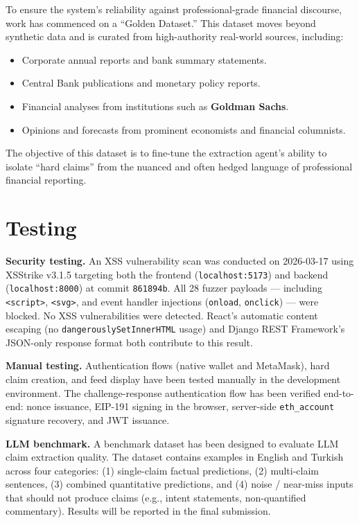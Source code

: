 \documentclass[a4paper,12pt]{report}
\begin{document}
To ensure the system's reliability against professional-grade financial discourse, work has commenced on a ``Golden Dataset.'' This dataset moves beyond synthetic data and is curated from high-authority real-world sources, including:
\begin{itemize}
    \item Corporate annual reports and bank summary statements.
    \item Central Bank publications and monetary policy reports.
    \item Financial analyses from institutions such as \textbf{Goldman Sachs}.
    \item Opinions and forecasts from prominent economists and financial columnists.
\end{itemize}
The objective of this dataset is to fine-tune the extraction agent's ability to isolate ``hard claims'' from the nuanced and often hedged language of professional financial reporting.

\section{Testing}

\textbf{Security testing.} An XSS vulnerability scan was conducted on 2026-03-17 using XSStrike v3.1.5 targeting both the frontend (\texttt{localhost:5173}) and backend (\texttt{localhost:8000}) at commit \texttt{861894b}. All 28 fuzzer payloads --- including \texttt{<script>}, \texttt{<svg>}, and event handler injections (\texttt{onload}, \texttt{onclick}) --- were blocked. No XSS vulnerabilities were detected. React's automatic content escaping (no \texttt{dangerouslySetInnerHTML} usage) and Django REST Framework's JSON-only response format both contribute to this result.

\textbf{Manual testing.} Authentication flows (native wallet and MetaMask), hard claim creation, and feed display have been tested manually in the development environment. The challenge-response authentication flow has been verified end-to-end: nonce issuance, EIP-191 signing in the browser, server-side \texttt{eth\_account} signature recovery, and JWT issuance.

\textbf{LLM benchmark.} A benchmark dataset has been designed to evaluate LLM claim extraction quality. The dataset contains examples in English and Turkish across four categories: (1) single-claim factual predictions, (2) multi-claim sentences, (3) combined quantitative predictions, and (4) noise / near-miss inputs that should not produce claims (e.g., intent statements, non-quantified commentary). Results will be reported in the final submission.
\end{document}
